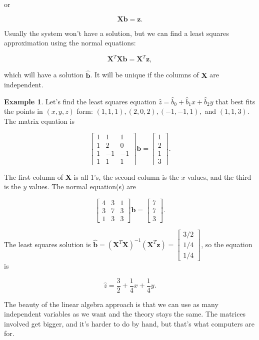 \documentclass[
]{book}
\theoremstyle{definition}
\theoremstyle{definition}
\newtheorem{example}{Example}[chapter]
\theoremstyle{definition}
\theoremstyle{definition}
\theoremstyle{remark}
\begin{document}
or

\[\mathbf{X}\mathbf{b}=\mathbf{z}.\]

Usually the system won't have a solution, but we can find a least squares approximation using the normal equations:

\[\mathbf{X}^T\mathbf{X}\mathbf{b}=\mathbf{X}^T\mathbf{z},\]

which will have a solution \(\hat{\mathbf{b}}\). It will be unique if the columns of \(\mathbf{X}\) are independent.

\begin{examplebox}

\begin{example}
Let's find the least squares equation \(\hat{z}=\hat{b}_0+\hat{b}_1x+\hat{b}_2 y\) that best fits the points in \((x,y,z)\) form: \((1,1,1),(2,0,2),(-1,-1,1),\) and \((1,1,3).\) The matrix equation is

\[\begin{bmatrix}
1 & 1 & 1 \\
1 & 2 & 0 \\
1 & -1 & -1 \\
1 & 1 & 1
\end{bmatrix}\mathbf{b}=
\begin{bmatrix}
1\\2\\1\\3
\end{bmatrix}.\]

The first column of \(\mathbf{X}\) is all 1's, the second column is the \(x\) values, and the third is the \(y\) values. The normal equation(s) are

\[\begin{bmatrix}
4 & 3 & 1\\3 & 7 & 3\\1 & 3 & 3
\end{bmatrix}\mathbf{b}=\begin{bmatrix}
7\\7\\3
\end{bmatrix}
 .\]

The least squares solution is \(\hat{\mathbf{b}}=(\mathbf{X}^T\mathbf{X})^{-1}(\mathbf{X}^T\mathbf{z})=\begin{bmatrix}
3/2\\1/4\\1/4
\end{bmatrix}\), so the equation is

\[\hat{z}=\frac{3}{2}+\frac{1}{4}x+\frac{1}{4}y.\]

The beauty of the linear algebra approach is that we can use as many independent variables as we want and the theory stays the same. The matrices involved get bigger, and it's harder to do by hand, but that's what computers are for.
\end{example}

\end{examplebox}
\end{document}
